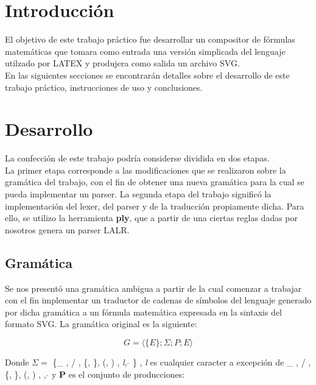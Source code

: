 \section{Introducción}

\indent \indent El objetivo de este trabajo práctico fue desarrollar un compositor de fórmulas matemáticas que tomara como entrada una versión simplicada del lenguaje utilzado por LATEX y produjera como salida un archivo SVG.\\
\indent \indent En las siguientes secciones se encontrarán detalles sobre el desarrollo de este trabajo práctico, instrucciones de uso y conclusiones.\\

\newpage

\section{Desarrollo}

\indent \indent La confección de este trabajo podría considerse dividida en dos etapas. \\
\indent La primer etapa corresponde a las modificaciones que se realizaron sobre la gramática del trabajo, con el fin de obtener una nueva gramática para la cual se pueda implementar un parser.
\indent La segunda etapa del trabajo significó la implementación del lexer, del parser y de la traducción propiamente dicha. Para ello, se utilizo la herramienta \textbf{ply}, que a partir de una ciertas reglas dadas por nosotros genera un parser LALR.\\

\subsection{Gramática}

\indent Se nos presentó una gramática ambigua a partir de la cual comenzar a trabajar con el fin implementar un traductor de cadenas de símbolos del lenguaje generado por dicha gramática a un fórmula matemática expresada en la sintaxis del formato SVG.
\indent La gramática original es la siguiente:

 \begin{equation}
    G = \langle \{ E\};\Sigma;P;E \rangle
 \end{equation}

\indent Donde $\Sigma = $ \{\_ , / , \{, \}, (, ) , \textit{l}, $\hat{}$ \} , \textit{l} es cualquier caracter a excepción de \_ , / , \{, \}, (, ) , , $\hat{}$  y \textbf{P} es el conjunto de producciones:

